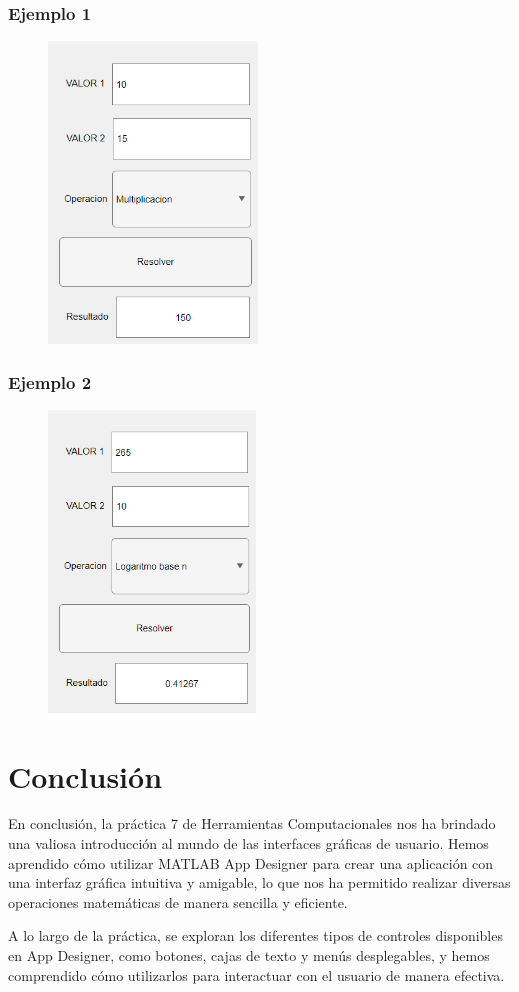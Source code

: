 \documentclass{article}
\begin{document}
	\subsubsection{Ejemplo 1}
	
	\begin{figure}[h]
		\centering
		\includegraphics[height = 8cm]{img2.png}
	\end{figure}
	
	\subsubsection{Ejemplo 2}
	
	\begin{figure}[h]
		\centering
		\includegraphics[height = 8cm]{img3.png}
	\end{figure}
	
	\newpage
	\section{Conclusión}
	
	En conclusión, la práctica 7 de Herramientas Computacionales nos ha brindado una valiosa introducción al mundo de las interfaces gráficas de usuario. Hemos aprendido cómo utilizar MATLAB App Designer para crear una aplicación con una interfaz gráfica intuitiva y amigable, lo que nos ha permitido realizar diversas operaciones matemáticas de manera sencilla y eficiente.
	
	A lo largo de la práctica, se exploran los diferentes tipos de controles disponibles en App Designer, como botones, cajas de texto y menús desplegables, y hemos comprendido cómo utilizarlos para interactuar con el usuario de manera efectiva.
	
\end{document}
